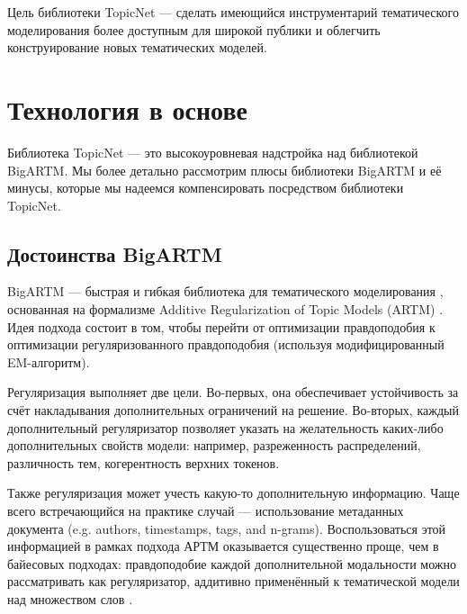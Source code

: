 Цель библиотеки TopicNet --- сделать имеющийся инструментарий тематического моделирования более доступным для широкой публики и облегчить конструирование новых тематических моделей.  


\section{Технология в основе} 

Библиотека TopicNet --- это высокоуровневая надстройка над библиотекой BigARTM. Мы более детально рассмотрим плюсы библиотеки \mbox{BigARTM} и её минусы, которые мы надеемся компенсировать посредством библиотеки TopicNet.  

\subsection{Достоинства BigARTM} 


BigARTM --- быстрая и гибкая библиотека для тематического моделирования \cite{frei2016parallel}, основанная на формализме Additive Regularization of Topic Models (ARTM) \cite{vorontsov2014additive}. Идея подхода состоит в том, чтобы перейти от оптимизации правдоподобия к оптимизации регуляризованного правдоподобия (используя модифицированный EM-алгоритм).

Регуляризация выполняет две цели. Во-первых, она обеспечивает устойчивость за счёт накладывания дополнительных ограничений на решение. Во-вторых, каждый дополнительный регуляризатор позволяет указать на желательность каких-либо дополнительных свойств модели: например, разреженность распределений, различность тем, когерентность верхних токенов.  

Также регуляризация может учесть какую-то дополнительную информацию. Чаще всего встречающийся на практике случай --- использование метаданных документа (e.g. authors, timestamps, tags, and n-grams). Воспользоваться этой информацией в рамках подхода АРТМ оказывается существенно проще, чем в байесовых подходах: правдоподобие каждой дополнительной модальности можно рассматривать как регуляризатор, аддитивно применённый к тематической модели над множеством слов \cite{voron15nonbayesian}.  

